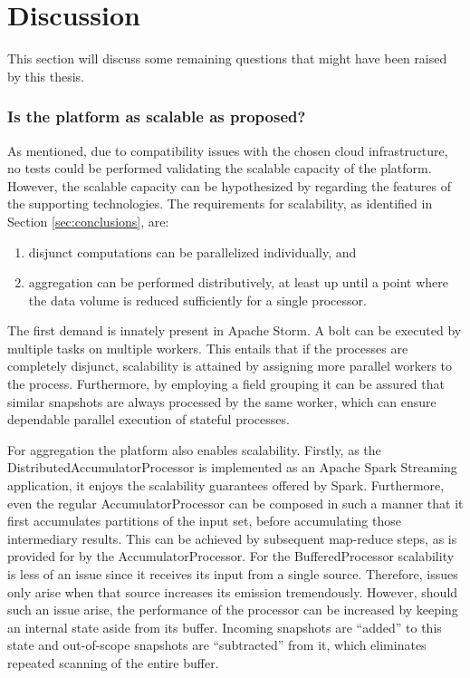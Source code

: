 \section{Discussion}
\label{sec:conclusion:discussion}
This section will discuss some remaining questions that might have been raised by this thesis.
\subsubsection{Is the platform as scalable as proposed?}
As mentioned, due to compatibility issues with the chosen cloud infrastructure, no tests could be performed validating the scalable capacity of the platform. However, the scalable capacity can be hypothesized by regarding the features of the supporting technologies. The requirements for scalability, as identified in Section \ref{sec:conclusions}, are:
\begin{enumerate}
\nospace
\item disjunct computations can be parallelized individually, and
\item aggregation can be performed distributively, at least up until a point where the data volume is reduced sufficiently for a single processor.
\end{enumerate}
The first demand is innately present in Apache Storm. A bolt can be executed by multiple tasks on multiple workers. This entails that if the processes are completely disjunct, scalability is attained by assigning more parallel workers to the process. Furthermore, by employing a field grouping it can be assured that similar snapshots are always processed by the same worker, which can ensure dependable parallel execution of stateful processes.

For aggregation the platform also enables scalability. Firstly, as the DistributedAccumulatorProcessor is implemented as an Apache Spark Streaming application, it enjoys the scalability guarantees offered by Spark. Furthermore, even the regular AccumulatorProcessor can be composed in such a manner that it first accumulates partitions of the input set, before accumulating those intermediary results. This can be achieved by subsequent map-reduce steps, as is provided for by the AccumulatorProcessor. For the BufferedProcessor scalability is less of an issue since it receives its input from a single source. Therefore, issues only arise when that source increases its emission tremendously. However, should such an issue arise, the performance of the processor can be increased by keeping an internal state aside from its buffer. Incoming snapshots are ``added'' to this state and out-of-scope snapshots are ``subtracted'' from it, which eliminates repeated scanning of the entire buffer.

